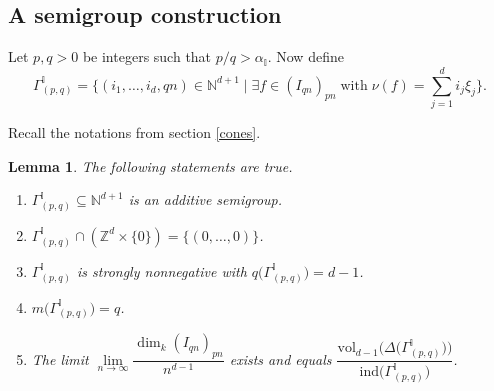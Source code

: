 \documentclass[12pt,a4paper]{amsart}
\theoremstyle{plain}
\newtheorem{lemma}[theorem]{Lemma}
\theoremstyle{definition}
\numberwithin{equation}{theorem}
\begin{document}
\subsection{A semigroup construction}

Let $p,q>0$ be integers such that $p/q>\alpha_{\mathbb{I}}$. Now define
\begin{equation}\label{eq_semigroup}
 \Gamma^{\mathbb{I}}_{(p,q)} = \Big\{(i_1,\ldots,i_d,qn) \in \mathbb{N}^{d+1} \;\big\vert \; \exists f\in {\left(I_{qn}\right)}_{pn}\;\text{with}\;\nu(f)=\sum_{j=1}^d i_j\xi_j\Big\}.
\end{equation}

Recall the notations from section \ref{cones}.

\begin{lemma}\label{lem_properties}
 The following statements are true.
 \begin{enumerate}[$(i)$]
  \item $\Gamma^{\mathbb{I}}_{(p,q)} \subseteq \mathbb{N}^{d+1}$ is an additive semigroup.
  \item $\Gamma^{\mathbb{I}}_{(p,q)} \cap \left(\mathbb{Z}^d \times \{0\}\right) = \{(0,\ldots,0)\}$.
  \item $\Gamma^{\mathbb{I}}_{(p,q)}$ is strongly nonnegative with $q\big(\Gamma^{\mathbb{I}}_{(p,q)}\big) = d-1$.
  \item $m\big(\Gamma^{\mathbb{I}}_{(p,q)}\big)=q$.
  \item The limit $\lim\limits_{n\to\infty}\dfrac{\dim_k {\left(I_{qn}\right)}_{pn}}{n^{d-1}}$ exists and equals $\dfrac{\mathrm{vol}_{d-1}\big(\Delta\big(\Gamma^{\mathbb{I}}_{(p,q)}\big)\big)}{\mathrm{ind}\big(\Gamma^{\mathbb{I}}_{(p,q)}\big)}$.
 \end{enumerate}
\end{lemma}
\end{document}
